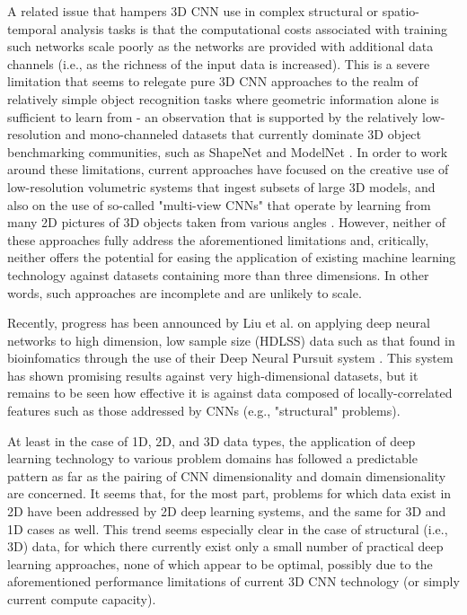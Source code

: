 \documentclass{article}
\begin{document}
A related issue that hampers 3D CNN use in complex structural or spatio-temporal analysis tasks is that the computational costs associated with training such networks scale poorly as the networks are provided with additional data channels (i.e., as the richness of the input data is increased). This is a severe limitation that seems to relegate pure 3D CNN approaches to the realm of relatively simple object recognition tasks where geometric information alone is sufficient to learn from - an observation that is supported by the relatively low-resolution and mono-channeled datasets that currently dominate 3D object benchmarking communities, such as ShapeNet \cite{shapenet2015} and ModelNet \cite{ModelNet15}. In order to work around these limitations, current approaches have focused on the creative use of low-resolution volumetric systems that ingest subsets of large 3D models, and also on the use of so-called "multi-view CNNs" that operate by learning from many 2D pictures of 3D objects taken from various angles \cite{2016arXiv160403265Q} \cite{AtomNet}. However, neither of these approaches fully address the aforementioned limitations and, critically, neither offers the potential for easing the application of existing machine learning technology against datasets containing more than three dimensions. In other words, such approaches are incomplete and are unlikely to scale. 

Recently, progress has been announced by Liu et al. on applying deep neural networks to high dimension, low sample size (HDLSS) data such as that found in bioinfomatics through the use of their Deep Neural Pursuit system \cite{ijcai2017-318}. This system has shown promising results against very high-dimensional datasets, but it remains to be seen how effective it is against data composed of locally-correlated features such as those addressed by CNNs (e.g., "structural" problems).  

At least in the case of 1D, 2D, and 3D data types, the application of deep learning technology to various problem domains has followed a predictable pattern as far as the pairing of CNN dimensionality and domain dimensionality are concerned. It seems that, for the most part, problems for which data exist in 2D have been addressed by 2D deep learning systems, and the same for 3D and 1D cases as well. This trend seems especially clear in the case of structural (i.e., 3D) data, for which there currently exist only a small number of practical deep learning approaches, none of which appear to be optimal, possibly due to the aforementioned performance limitations of current 3D CNN technology (or simply current compute capacity). 
\end{document}
